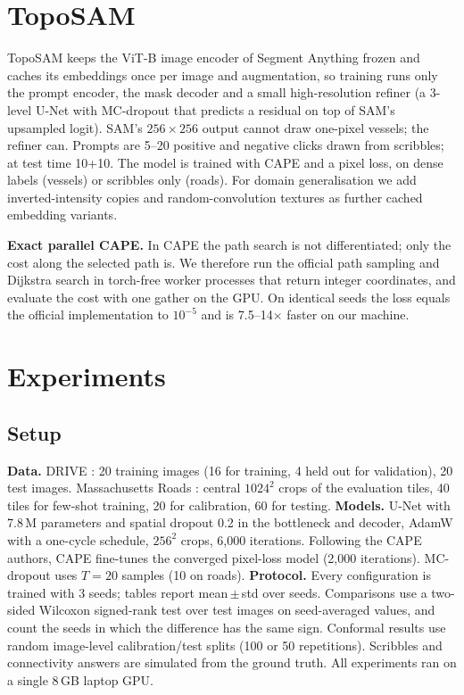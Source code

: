 \documentclass[10pt,letterpaper,journal]{IEEEtran}
\newcommand{\1}{\mathbf{1}}
\begin{document}
\section{TopoSAM}\label{sec:sam}
TopoSAM keeps the ViT-B image encoder of Segment Anything \cite{sam} frozen and caches its embeddings once per image and augmentation, so training runs only the prompt encoder, the mask decoder and a small high-resolution refiner (a 3-level U-Net with MC-dropout that predicts a residual on top of SAM's upsampled logit). SAM's $256\times256$ output cannot draw one-pixel vessels; the refiner can. Prompts are 5--20 positive and negative clicks drawn from scribbles; at test time 10+10. The model is trained with CAPE and a pixel loss, on dense labels (vessels) or scribbles only (roads). For domain generalisation we add inverted-intensity copies and random-convolution textures \cite{randconv} as further cached embedding variants.

\textbf{Exact parallel CAPE.} In CAPE the path search is not differentiated; only the cost along the selected path is. We therefore run the official path sampling and Dijkstra search \cite{cape} in torch-free worker processes that return integer coordinates, and evaluate the cost with one gather on the GPU. On identical seeds the loss equals the official implementation to $10^{-5}$ and is 7.5--14$\times$ faster on our machine.

\section{Experiments}\label{sec:exp}
\subsection{Setup}
\textbf{Data.} DRIVE \cite{drive}: 20 training images (16 for training, 4 held out for validation), 20 test images. Massachusetts Roads \cite{mnih2013}: central $1024^2$ crops of the evaluation tiles, 40 tiles for few-shot training, 20 for calibration, 60 for testing.
\textbf{Models.} U-Net \cite{unet} with 7.8\,M parameters and spatial dropout 0.2 in the bottleneck and decoder, AdamW with a one-cycle schedule, $256^2$ crops, 6,000 iterations. Following the CAPE authors, CAPE fine-tunes the converged pixel-loss model (2,000 iterations). MC-dropout uses $T=20$ samples (10 on roads).
\textbf{Protocol.} Every configuration is trained with 3 seeds; tables report mean\,$\pm$\,std over seeds. Comparisons use a two-sided Wilcoxon signed-rank test \cite{wilcoxon} over test images on seed-averaged values, and count the seeds in which the difference has the same sign. Conformal results use random image-level calibration/test splits (100 or 50 repetitions). Scribbles and connectivity answers are simulated from the ground truth. All experiments ran on a single 8\,GB laptop GPU.
\end{document}

